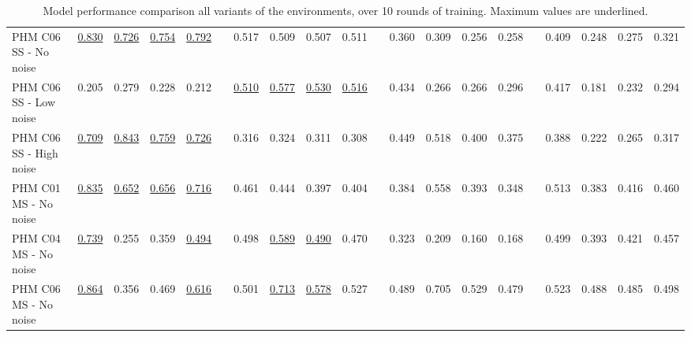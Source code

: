 \documentclass[a4paper, 12pt]{article}
\begin{document}
\begin{landscape}
\begin{table}
\begin{tabular}{@{}l rrrr @{\kern8pt}c rrrr @{\kern8pt}c rrrr @{\kern8pt}c rrrr@{}}
			PHM C06 SS - No noise &\underline{0.830} &\underline{0.726} &\underline{0.754} & \underline{0.792} & & 0.517 &0.509 &0.507 &0.511 & &0.360 &0.309 &0.256 &0.258 & &0.409 &0.248 &0.275&0.321\\
			PHM C06 SS - Low noise &0.205 &0.279 &0.228 & 0.212 & & \underline{0.510} &\underline{0.577} &\underline{0.530} &\underline{0.516} & &0.434 &0.266 &0.266 &0.296 & &0.417 &0.181 &0.232&0.294\\
			PHM C06 SS - High noise &\underline{0.709} &\underline{0.843} &\underline{0.759 }& \underline{0.726} & & 0.316 &0.324 &0.311 &0.308 & &0.449 &0.518 &0.400 &0.375 & &0.388 &0.222 &0.265&0.317\\ \midrule
			
			PHM C01 MS - No noise &\underline{0.835} &\underline{0.652} &\underline{0.656} & \underline{0.716} & & 0.461 &0.444 &0.397 &0.404 & &0.384 &0.558 &0.393 &0.348 & &0.513 &0.383 &0.416&0.460\\
			PHM C04 MS - No noise &\underline{0.739} &0.255 &0.359 & \underline{0.494} & & 0.498 &\underline{0.589 }&\underline{0.490} &0.470 & &0.323 &0.209 &0.160 &0.168 & &0.499 &0.393 &0.421&0.457\\
			PHM C06 MS - No noise &\underline{0.864} &0.356 &0.469 & \underline{0.616} & & 0.501 &\underline{0.713} &\underline{0.578} &0.527 & &0.489 &0.705 &0.529 &0.479 & &0.523 &0.488 &0.485&0.498\\
			
			\bottomrule
		\end{tabular}
		\caption{Model performance comparison all variants of the environments, over 10 rounds of training. Maximum values are underlined.}
		\label{tbl:DetailedMetrics}
	\end{table}
\end{landscape}
\restoregeometry %
\end{document}
